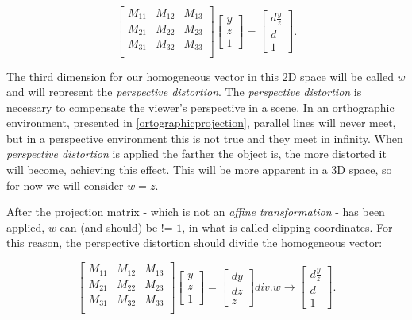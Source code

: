 \documentclass[cic,tc,english]{iiufrgs}
\begin{document}
\begin{equation}
    \begin{bmatrix}
        M_{11} & M_{12} & M_{13}\\
        M_{21} & M_{22} & M_{23}\\
        M_{31} & M_{32} & M_{33} \\
    \end{bmatrix}
    \begin{bmatrix}
        y \\
        z \\
        1
    \end{bmatrix}
    =
    \begin{bmatrix}
        d \frac{y}{z} \\
        d \\
        1
    \end{bmatrix}
    .
\end{equation}

The third dimension for our homogeneous vector in this 2D space will be called $w$ and will represent the \textit{perspective distortion}. The \textit{perspective distortion} is necessary to compensate the viewer's perspective in a scene. In an orthographic environment, presented in \cref{ortographicprojection}, parallel lines will never meet, but in a perspective environment this is not true and they meet in infinity. When \textit{perspective distortion} is applied the farther the object is, the more distorted it will become, achieving this effect. This will be more apparent in a 3D space, so for now we will consider $w = z$.

After the projection matrix - which is not an \textit{affine transformation} - has been applied, $w$ can (and should) be != $1$, in what is called clipping coordinates. For this reason, the perspective distortion should divide the homogeneous vector:

\begin{equation}
    \begin{bmatrix}
        M_{11} & M_{12} & M_{13} \\
        M_{21} & M_{22} & M_{23} \\
        M_{31} & M_{32} & M_{33} \\
    \end{bmatrix}
    \begin{bmatrix}
        y \\
        z \\
        1
    \end{bmatrix}
    =
    \begin{bmatrix}
        d y \\
        d z \\
        z
    \end{bmatrix}
    div. w \rightarrow
    \begin{bmatrix}
        d \frac{y}{z} \\
        d             \\
        1
    \end{bmatrix}
    .
\end{equation}
\end{document}
